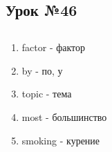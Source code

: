 \subsection{Урок №46}

\subsection*{}
\begin{multicols}{2}
    \begin{enumerate}\setlength{\itemsep}{0pt}
        \item factor - фактор
        \item by - по, у
        \item topic - тема
        \item most - большинство
        \item smoking - курение
    \end{enumerate}
\end{multicols}